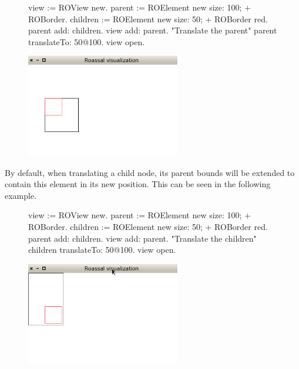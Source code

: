 \documentclass[a4paper,10pt,twoside]{book}
\begin{document}
\begin{figure}[H]
      \begin{minipage}[t]{0.5\textwidth}
      \vspace{0pt}
\begin{code}{}
view := ROView new.
parent := ROElement new 
				size: 100;
				+ ROBorder.
children := ROElement new 
				size: 50;
				+ ROBorder red.
parent add: children.
view add: parent.
"Translate the parent"
parent translateTo: 50@100.
view open.
\end{code}
   \end{minipage}
   \hfill
   \begin{minipage}[t]{0.6\textwidth}
      \vspace{0pt} \raggedright
       \centering
		\includegraphics[width=0.6\textwidth]{ex5}
   \end{minipage}
\label{fig:ex5}
\end{figure}

By default, when translating a child node, its parent bounds will be extended to contain this element in its new position. This can be seen in the following example.

\begin{figure}[H]
      \begin{minipage}[t]{0.5\textwidth}
      \vspace{0pt}
\begin{code}{}
view := ROView new.
parent := ROElement new 
				size: 100;
				+ ROBorder.
children := ROElement new 
				size: 50;
				+ ROBorder red.
parent add: children.
view add: parent.
"Translate the children"
children translateTo: 50@100.
view open.
\end{code}
   \end{minipage}
   \hfill
   \begin{minipage}[t]{0.6\textwidth}
      \vspace{0pt} \raggedright
       \centering
		\includegraphics[width=0.6\textwidth]{ex6}
   \end{minipage}
\label{fig:ex5}
\end{figure}
\end{document}
